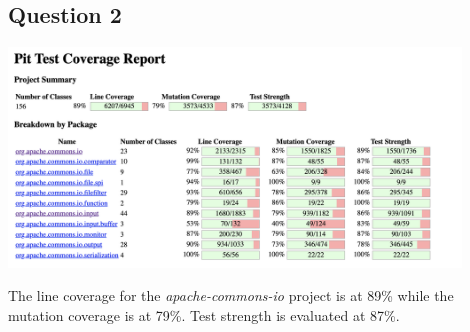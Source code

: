 \subsection*{Question 2}

\begin{center}
        \includegraphics[width=0.9\textwidth]{img/partC-coverage.png}
\end{center}


\noindent The line coverage for the \textit{apache-commons-io} project is at 89\% while the mutation coverage is at 79\%. Test strength is evaluated at 87\%.